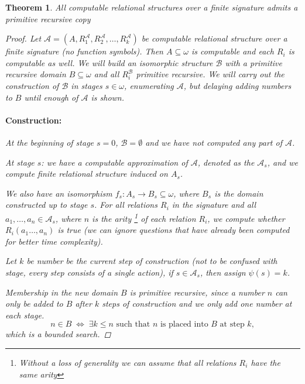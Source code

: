 \documentclass{pracalicmgr2025}
\theoremstyle{plain}            %
\newtheorem{theorem}{Theorem}[chapter]
\theoremstyle{remark}           %
\theoremstyle{definition}       %
\begin{document}
\begin{theorem}\label{Rel str p.r}
    All computable relational structures over a finite signature admits a primitive recursive copy
    \begin{proof} 
        Let $\mathcal{A}= (A,R_1^\mathcal{A}, R_2^\mathcal{A}, \dots,R_k^\mathcal{A})$ be computable relational structure over a finite signature (no function symbols).
        Then $A \subseteq \omega$ is computable and each $R_i$ is computable as well. We will build an isomorphic structure $\mathcal{B}$ with a primitive recursive domain $B \subseteq \omega$ and all $R_i^\mathcal{B}$ primitive recursive. We will carry out the construction of $\mathcal{B}$ in stages $s \in \omega$, enumerating $\mathcal{A}$, but delaying adding numbers to $B$ until enough of $\mathcal{A}$ is shown.

        \paragraph{Construction:} At the beginning of stage $s =0$, $\mathcal{B} = \emptyset$ and we have not computed any part of $\mathcal{A}$.

    
        At stage $s$: we have a computable approximation of $\mathcal{A}$, denoted as the $\mathcal{A}_s$, and we compute finite relational structure induced on $A_s$. 
        
        We also have an isomorphism $f_s : A_s \to B_s \subseteq \omega$, where $B_s$ is the domain constructed up to stage $s$. For all relations $R_i$ in the signature and all $a_1,\dots,a_n \in \mathcal{A}_s$, where $n$ is the arity \footnote{ Without a loss of generality we can assume that all relations $R_i$ have the same arity} of each relation $R_i$, we compute whether $R_i(a_1\dots,a_n)$ is true (we can ignore questions that have already been computed for better time complexity). 

        Let $k$ be number be the current step of construction (not to be confused with stage, every step consists of a single action), if $s \in \mathcal{A}_s$, then assign $\psi(s) = k$.
        
        
         Membership in the new domain $B$ is primitive recursive, since a number $n$ can only be added to $B$ after $k$ steps of construction and we only add one number at each stage.
        $$
        n \in B \;\Longleftrightarrow\; \exists k \le n \text{ such that $n$ is placed into $B$ at step } k,
        $$
        which is a bounded search.


\end{proof}
\end{theorem}
\end{document}
